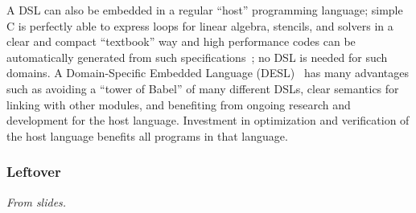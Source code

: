 \label{DESL}
A DSL can also be embedded in a regular ``host'' programming language; simple C is perfectly able to express loops for linear algebra, stencils, and solvers in a clear and compact ``textbook'' way and high performance codes can be automatically generated from such specifications~\cite{meister-rstream}; no DSL is needed for such domains.  A Domain-Specific Embedded Language (DESL)~\cite{hudak1997domain} has many advantages such as avoiding a ``tower of Babel'' of many different DSLs, clear semantics for linking with other modules, and benefiting from ongoing research and development for the host language.  Investment in optimization and verification of the host language benefits all programs in that language.  

\subsubsection{Leftover}


{\small\em From slides.}

